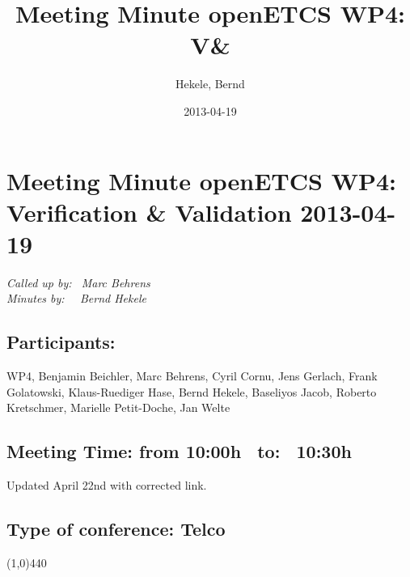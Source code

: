 \documentclass[a4paper]{article}
\title{Meeting Minute openETCS WP4: V&\V}
\author{Hekele, Bernd}
\date{2013-04-19}
\begin{document}
\section*{\large{Meeting Minute openETCS WP4: Verification \& Validation 2013-04-19}}

\emph{Called up by: \ Marc Behrens}\\
\emph{Minutes by: \ \  Bernd Hekele}


\subsection*{Participants:} WP4, 
Benjamin Beichler,
Marc Behrens, 
Cyril Cornu, 
Jens Gerlach, 
Frank Golatowski, 
Klaus-Ruediger Hase, 
Bernd Hekele,
Baseliyos Jacob,
Roberto Kretschmer,
Marielle Petit-Doche, 
Jan Welte\\

\subsection*{Meeting Time: from 10:00h \ to: \ 10:30h}
Updated April 22nd with corrected link.

\subsection*{Type of conference: Telco}

\line(1,0){440}
\end{document}
